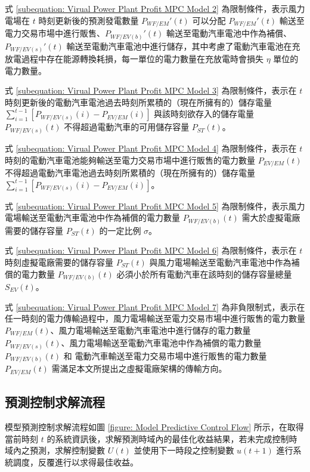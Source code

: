 式 \eqref{subequation: Virual Power Plant Profit MPC Model 2} 為限制條件，表示風力電場在 $t$ 時刻更新後的預測發電數量 $P_{WF/EM}'(t)$ 可以分配 $P_{WF/EM}'(t)$ 輸送至電力交易市場中進行販售、$P_{WF/EV(b)}'(t)$ 輸送至電動汽車電池中作為補償、$P_{WF/EV(s)}'(t)$ 輸送至電動汽車電池中進行儲存，其中考慮了電動汽車電池在充放電過程中存在能源轉換耗損，每一單位的電力數量在充放電時會損失 $\eta$ 單位的電力數量。

式 \eqref{subequation: Virual Power Plant Profit MPC Model 3} 為限制條件，表示在 $t$ 時刻更新後的電動汽車電池過去時刻所累積的（現在所擁有的）儲存電量 $\sum_{i=1}^{t-1} \left[ P_{WF/EV(s)}(i) - P_{EV/EM}(i) \right]$ 與該時刻欲存入的儲存電量 $P_{WF/EV(s)}(t)$ 不得超過電動汽車的可用儲存容量 $P_{ST}(t)$。

式 \eqref{subequation: Virual Power Plant Profit MPC Model 4} 為限制條件，表示在 $t$ 時刻的電動汽車電池能夠輸送至電力交易市場中進行販售的電力數量 $P_{EV/EM}(t)$ 不得超過電動汽車電池過去時刻所累積的（現在所擁有的）儲存電量 $\sum_{i=1}^{t-1} \left[ P_{WF/EV(s)}(i) - P_{EV/EM}(i) \right]$。

式 \eqref{subequation: Virual Power Plant Profit MPC Model 5} 為限制條件，表示風力電場輸送至電動汽車電池中作為補償的電力數量 $P_{WF/EV(b)}(t)$
 需大於虛擬電廠需要的儲存容量 $P_{ST}(t)$ 的一定比例 $\sigma$。

式 \eqref{subequation: Virual Power Plant Profit MPC Model 6} 為限制條件，表示在 $t$ 時刻虛擬電廠需要的儲存容量 $P_{ST}(t)$ 與風力電場輸送至電動汽車電池中作為補償的電力數量 $P_{WF/EV(b)}(t)$ 必須小於所有電動汽車在該時刻的儲存容量總量 $S_{EV}(t)$。

式 \eqref{subequation: Virual Power Plant Profit MPC Model 7} 為非負限制式，表示在任一時刻的電力傳輸過程中，風力電場輸送至電力交易市場中進行販售的電力數量 $P_{WF/EM}(t)$、風力電場輸送至電動汽車電池中進行儲存的電力數量 $P_{WF/EV(s)}(t)$、風力電場輸送至電動汽車電池中作為補償的電力數量 $P_{WF/EV(b)}(t)$ 和 電動汽車輸送至電力交易市場中進行販售的電力數量 $P_{EV/EM}(t)$ 需滿足本文所提出之虛擬電廠架構的傳輸方向。

\subsection{預測控制求解流程}

模型預測控制求解流程如圖 \ref{figure: Model Predictive Control Flow} 所示，在取得當前時刻 $t$ 的系統資訊後，求解預測時域內的最佳化收益結果，若未完成控制時域內之預測，求解控制變數 $U(t)$ 並使用下一時段之控制變數 $u(t + 1)$ 進行系統調度，反覆進行以求得最佳收益。

